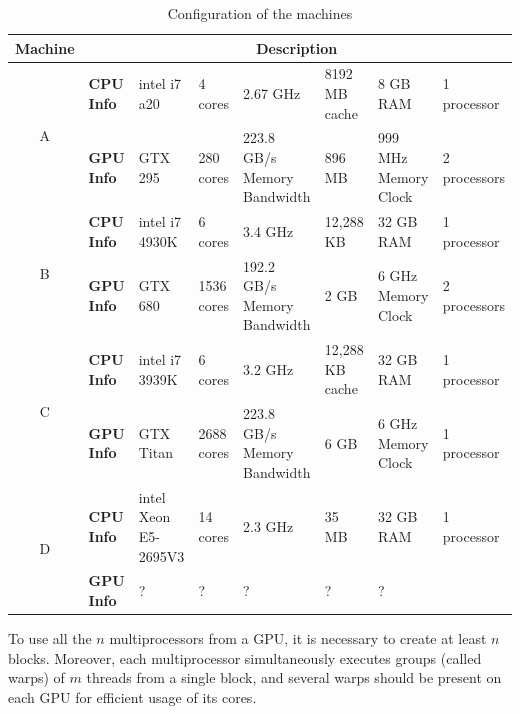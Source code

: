 \documentclass[journal]{IEEEtran}
\begin{document}
\begin{table}[t]
\begin{scriptsize}
\caption{Configuration of the machines}
\begin{tabular}{|c|l|l|l|l|l|l|l|} \hline
\multicolumn{1}{|l|}{Machine} & \multicolumn{7}{|c|}{\textbf{Description}}                                                                                                                \\ \hline
\multirow{2}{*}{A}          & \textbf{CPU Info} & intel i7 a20         & 4 cores    & 2.67 GHz                    & 8192 MB cache   & 8 GB RAM             & 1 processor  \\ \cline{2-8}
                            & \textbf{GPU Info} & GTX 295              & 280 cores  & 223.8 GB/s Memory Bandwidth & 896 MB          & 999 MHz Memory Clock & 2 processors \\ \hline
\multirow{2}{*}{B}          & \textbf{CPU Info} & intel i7 4930K       & 6 cores    & 3.4 GHz                     & 12,288 KB       & 32 GB RAM            & 1 processor  \\  \cline{2-8}
                            & \textbf{GPU Info} & GTX 680              & 1536 cores & 192.2 GB/s Memory Bandwidth & 2 GB            & 6 GHz Memory Clock   & 2 processors \\ \hline
\multirow{2}{*}{C}          & \textbf{CPU Info} & intel i7 3939K       & 6 cores    & 3.2 GHz                     & 12,288 KB cache & 32 GB RAM            & 1 processor  \\  \cline{2-8}
                            & \textbf{GPU Info} & GTX Titan            & 2688 cores & 223.8 GB/s Memory Bandwidth & 6 GB            & 6 GHz Memory Clock   & 1 processor  \\ \hline
\multirow{2}{*}{D}          & \textbf{CPU Info} & intel Xeon E5-2695V3 & 14 cores   & 2.3 GHz                     & 35 MB           & 32 GB RAM            & 1 processor  \\  \cline{2-8}
                            & \textbf{GPU Info} & ?                    & ?          & ?                           & ?               & ?                    &            \\ \hline 
\end{tabular}
\end{scriptsize}
\end{table}

To use all the $n$ multiprocessors from a GPU, it is necessary to create at least
$n$ blocks. Moreover, each multiprocessor simultaneously executes groups (called
warps) of $m$ threads from a single block, and several warps should be present
on each GPU for efficient usage of its cores.
\end{document}

